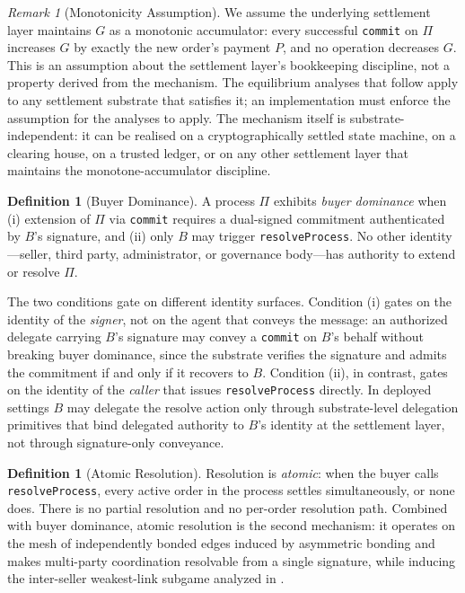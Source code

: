 \documentclass[11pt,a4paper]{article}
\theoremstyle{definition}
\newtheorem{definition}[theorem]{Definition}
\theoremstyle{remark}
\newtheorem{remark}[theorem]{Remark}
\newcommand{\pay}{P}           %
\newcommand{\cumval}{G}        %
\begin{document}
\begin{remark}[Monotonicity Assumption]
\label{rem:monotonicity-assumption}
We assume the underlying settlement layer maintains $\cumval$ as a
monotonic accumulator: every successful \texttt{commit} on $\Pi$
increases $\cumval$ by exactly the new order's payment $\pay$, and
no operation decreases $\cumval$. This is an assumption about the
settlement layer's bookkeeping discipline, not a property derived
from the mechanism. The equilibrium analyses that follow apply to
any settlement substrate that satisfies it; an implementation must
enforce the assumption for the analyses to apply. The mechanism
itself is substrate-independent: it can be realised on a
cryptographically settled state machine, on a clearing house, on a
trusted ledger, or on any other settlement layer that maintains
the monotone-accumulator discipline.
\end{remark}

\begin{definition}[Buyer Dominance]
\label{def:buyer-dominance}
A process $\Pi$ exhibits \emph{buyer dominance} when (i) extension
of $\Pi$ via \texttt{commit} requires a dual-signed commitment
authenticated by $B$'s signature, and (ii) only $B$ may trigger
\texttt{resolveProcess}. No other identity---seller, third
party, administrator, or governance body---has authority to
extend or resolve $\Pi$.

The two conditions gate on different identity surfaces. Condition
(i) gates on the identity of the \emph{signer}, not on the agent
that conveys the message: an authorized delegate carrying $B$'s
signature may convey a \texttt{commit} on $B$'s behalf without
breaking buyer dominance, since the substrate verifies the
signature and admits the commitment if and only if it recovers to
$B$. Condition (ii), in contrast, gates on the identity of the
\emph{caller} that issues \texttt{resolveProcess} directly. In
deployed settings $B$ may delegate the resolve action only through
substrate-level delegation primitives that bind delegated authority
to $B$'s identity at the settlement layer, not through
signature-only conveyance.
\end{definition}

\begin{definition}[Atomic Resolution]
\label{def:atomic-resolution}
Resolution is \emph{atomic}: when the buyer calls
\texttt{resolveProcess}, every active order in the process settles
simultaneously, or none does. There is no partial resolution and
no per-order resolution path. Combined with buyer dominance,
atomic resolution is the second mechanism: it operates on the
mesh of independently bonded edges induced by asymmetric bonding
and makes multi-party coordination resolvable from a single
signature, while inducing the inter-seller weakest-link subgame
analyzed in .
\end{definition}
\end{document}
